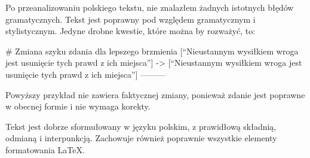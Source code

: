 Po przeanalizowaniu polskiego tekstu, nie znalazłem żadnych istotnych błędów gramatycznych. Tekst jest poprawny pod względem gramatycznym i stylistycznym. Jedyne drobne kwestie, które można by rozważyć, to:

# Zmiana szyku zdania dla lepszego brzmienia
[“Nieustannym wysiłkiem wroga jest usunięcie tych prawd z ich miejsca”]
->
[“Nieustannym wysiłkiem wroga jest usunięcie tych prawd z ich miejsca”]
---------

Powyższy przykład nie zawiera faktycznej zmiany, ponieważ zdanie jest poprawne w obecnej formie i nie wymaga korekty.

Tekst jest dobrze sformułowany w języku polskim, z prawidłową składnią, odmianą i interpunkcją. Zachowuje również poprawnie wszystkie elementy formatowania LaTeX.